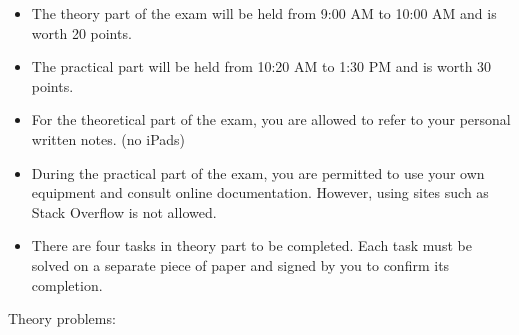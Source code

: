 \documentclass{exam}
\begin{document}
\pagestyle{headandfoot}
\runningheadrule
{}
\firstpagefooter{}{}{}
\runningfooter{}{}{}

\begin{itemize}
    \item The theory part of the exam will be held from 9:00 AM to 10:00 AM and is worth 20 points.
    \item The practical part will be held from 10:20 AM to 1:30 PM and is worth 30 points.
    \item For the theoretical part of the exam, you are allowed to refer to your personal written notes. (no iPads)
    \item During the practical part of the exam, you are permitted to use your own equipment and consult online documentation. However, using sites such as Stack Overflow is not allowed.
    \item There are four tasks in theory part to be completed. Each task must be solved on a separate piece of paper and signed by you to confirm its completion.
\end{itemize}

Theory problems:
\end{document}
